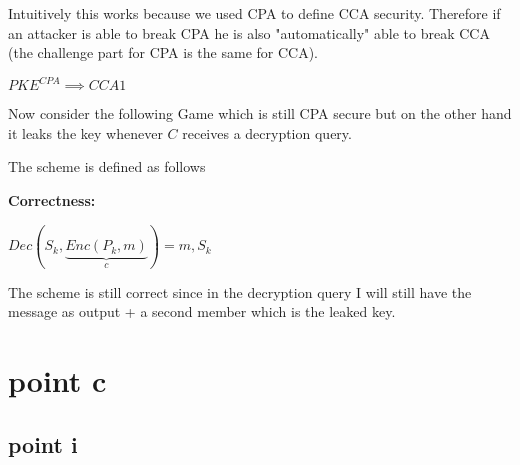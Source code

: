 \noindent Intuitively this works because we used CPA to define CCA security. Therefore if an attacker is able to break CPA he is also "automatically" able to break CCA (the challenge part for CPA is the same for CCA).

\bigskip
$PKE^{CPA} \implies CCA1$

Now consider the following Game which is still CPA secure but on the other hand it leaks the key whenever $C$ receives a decryption query.

The scheme is defined as follows
\begin{figure}[h!]
    \centering
    \sdinit{}
\end{figure}

\textbf{Correctness:}

$Dec(S_k,\underbrace{Enc(P_k,m)}_{c})=m,S_k$

The scheme is still correct since in the decryption query I will still have the message as output + a second member which is the leaked key. 

\newpage
\section{point c}
\subsection{point i}

